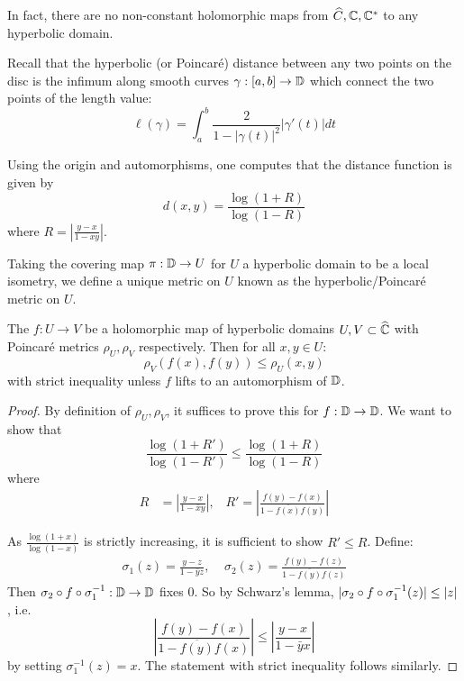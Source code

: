 \documentclass[10pt,a4paper]{article}
\begin{document}
In fact, there are no non-constant holomorphic maps from $\widehat{C}, \mathbb{C}, \mathbb{C}^\ast$ to any hyperbolic domain.

Recall that the hyperbolic (or Poincar\'e) distance between any two points on the disc is the infimum along smooth curves $\gamma : [a,b] \to \mathbb{D}$ which connect the two points of the length value:\[ \ell(\gamma) = \int_a^b \frac{2}{1-|\gamma(t)|^2}|\gamma'(t)| dt\]

Using the origin and automorphisms, one computes that the distance function is given by \[d(x,y) = \frac{\log(1+R)}{\log(1-R)}\] where $R = \left|\frac{y-x}{1-xy}\right|$.

\begin{definition}
  Taking the covering map $\pi:\mathbb{D}\to U$ for $U$ a hyperbolic domain to be a local isometry, we define a unique metric on $U$ known as the hyperbolic/Poincar\'e metric on $U$.
\end{definition}

\begin{theorem}
  The $f:U\to V$ be a holomorphic map of hyperbolic domains $U, V \subset \widehat{\mathbb{C}}$ with Poincar\'e metrics $\rho_U, \rho_V$ respectively. Then for all $x, y \in U$:\[ \rho_V(f(x), f(y)) \leq \rho_U(x,y)\] with strict inequality unless $f$ lifts to an automorphism of $\mathbb{D}$.
\end{theorem}
\begin{proof}
  By definition of $\rho_U, \rho_V$, it suffices to prove this for $f: \mathbb{D} \to \mathbb{D}$. We want to show that \[\frac{\log(1+R')}{\log(1-R')} \leq \frac{\log(1+R)}{\log(1-R)}\] where
  \begin{align*}
    R &= \left|\frac{y-x}{1-\bar{x}y}\right|,\;\;\;  R' = \left|\frac{f(y)-f(x)}{1-\overline{f(x)}f(y)}\right|
  \end{align*}

  As $\frac{\log(1+x)}{\log(1-x)}$ is strictly increasing, it is sufficient to show $R' \leq R$. Define:
  \begin{align*}
    \sigma_1(z) = \frac{y-z}{1-\bar{y}z},\;\;\;\;\sigma_2(z) = \frac{f(y)-f(z)}{1-\overline{f(y)}f(z)}
  \end{align*}
  Then $\sigma_2 \circ f \circ \sigma_1^{-1} : \mathbb{D} \to \mathbb{D}$ fixes 0. So by Schwarz's lemma, $|\sigma_2 \circ f \circ \sigma_1^{-1}(z)| \leq \lvert z\rvert$, i.e.
  \[
    \left|\frac{f(y)-f(x)}{1-\overline{f(y)}f(x)}\right| \leq \left|\frac{y-x}{1-\bar{y}x}\right|
  \]
by setting $\sigma_1^{-1}(z) = x$. The statement with strict inequality follows similarly.
\end{proof}
\end{document}
